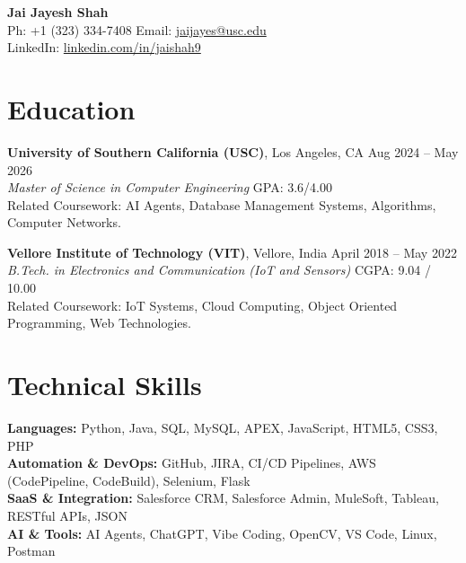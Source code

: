 \documentclass[letterpaper,10pt]{article}
\begin{document}
\begin{center}
    {\LARGE \textbf{Jai Jayesh Shah}} \\
    \vspace{5pt}
    \small
    Ph: +1 (323) 334-7408 \quad Email: \href{mailto:jaijayes@usc.edu}{jaijayes@usc.edu} \\
    LinkedIn: \href{https://www.linkedin.com/in/jaishah9}{linkedin.com/in/jaishah9} \\
    \vspace{-8pt}
\end{center}

\section*{Education}
\textbf{University of Southern California (USC)}, Los Angeles, CA \hfill Aug 2024 -- May 2026 \\
\textit{Master of Science in Computer Engineering} \hfill GPA: 3.6/4.00 \\
Related Coursework: AI Agents, Database Management Systems, Algorithms, Computer Networks.

\vspace{2pt}

\textbf{Vellore Institute of Technology (VIT)}, Vellore, India \hfill April 2018 -- May 2022 \\
\textit{B.Tech. in Electronics and Communication (IoT and Sensors)} \hfill CGPA: 9.04 / 10.00 \\
Related Coursework: IoT Systems, Cloud Computing, Object Oriented Programming, Web Technologies.

\section*{Technical Skills}
\textbf{Languages:} Python, Java, SQL, MySQL, APEX, JavaScript, HTML5, CSS3, PHP \\
\textbf{Automation \& DevOps:} GitHub, JIRA, CI/CD Pipelines, AWS (CodePipeline, CodeBuild), Selenium, Flask \\
\textbf{SaaS \& Integration:} Salesforce CRM, Salesforce Admin, MuleSoft, Tableau, RESTful APIs, JSON \\
\textbf{AI \& Tools:} AI Agents, ChatGPT, Vibe Coding, OpenCV, VS Code, Linux, Postman

\end{document}

